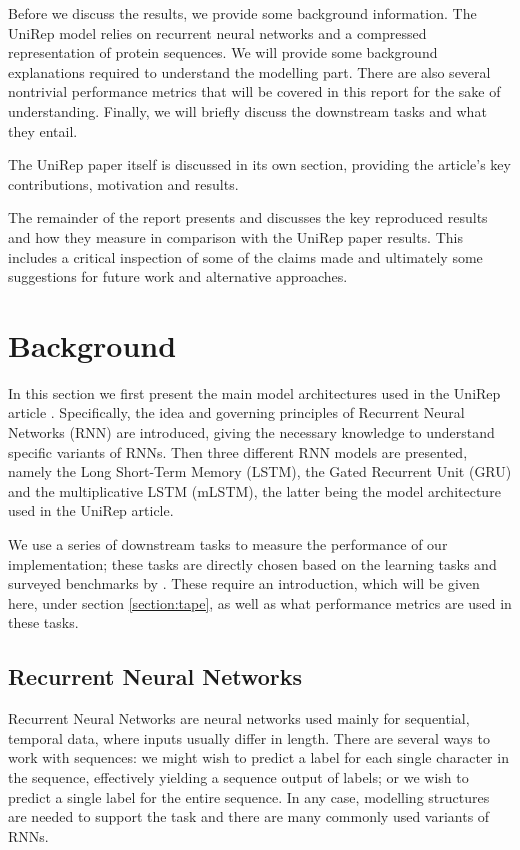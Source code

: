 \documentclass[a4paper,12pt]{article}
\begin{document}
Before we discuss the results, we provide some background information. The UniRep model relies on recurrent neural networks and a compressed representation of protein sequences. We will provide some background explanations required to understand the modelling part. There are also several nontrivial performance metrics that will be covered in this report for the sake of understanding. Finally, we will briefly discuss the downstream tasks and what they entail.

The UniRep paper itself is discussed in its own section, providing the article's key contributions, motivation and results.

The remainder of the report presents and discusses the key reproduced results and how they measure in comparison with the UniRep paper results. This includes a critical inspection of some of the claims made and ultimately some suggestions for future work and alternative approaches.


\clearpage
\section{Background}
\label{section:background}

In this section we first present the main model architectures used in the UniRep article \cite{alley2019unified}. Specifically, the idea and governing principles of Recurrent Neural Networks (RNN) are introduced, giving the necessary knowledge to understand specific variants of RNNs. Then three different RNN models are presented, namely the Long Short-Term Memory (LSTM), the Gated Recurrent Unit (GRU) and the multiplicative LSTM (mLSTM), the latter being the model architecture used in the UniRep article.

We use a series of downstream tasks to measure the performance of our implementation; these tasks are directly chosen based on the learning tasks and surveyed benchmarks by \cite{tape2019}. These require an introduction, which will be given here, under section \ref{section:tape}, as well as what performance metrics are used in these tasks.

\subsection{Recurrent Neural Networks}
Recurrent Neural Networks are neural networks used mainly for sequential, temporal data, where inputs usually differ in length. There are several ways to work with sequences: we might wish to predict a label for each single character in the sequence, effectively yielding a sequence output of labels; or we wish to predict a single label for the entire sequence. In any case, modelling structures are needed to support the task and there are many commonly used variants of RNNs.
\end{document}
